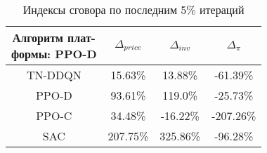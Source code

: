 \bgroup
\def\arraystretch{1.25}
\begin{table}[H]
	\caption{Индексы сговора по последним 5\% итераций}
	\label{tables:platforms_dynamic}
	\begin{center}
		\vspace{-0.5em}
		\begin{tabular}{c||ccc}
			\toprule
			\makecell{Алгоритм плат-\\ формы: PPO-D} & $\Delta_{price}$ & $\Delta_{inv}$ & $\Delta_{\pi}$ \\
			\midrule
			TN-DDQN & 15.63\% & 13.88\% & -61.39\% \\
			PPO-D & 93.61\% & 119.0\% & -25.73\% \\
			PPO-C & 34.48\% & -16.22\% & -207.26\% \\
			SAC & 207.75\% & 325.86\% & -96.28\% \\
			\bottomrule
		\end{tabular}
	\end{center}
\end{table}
\egroup